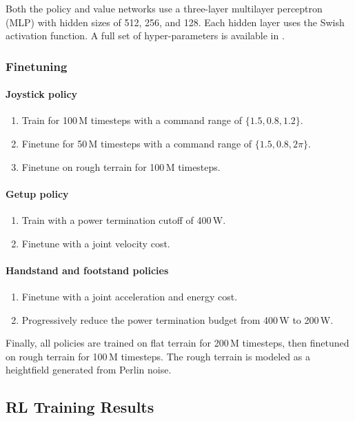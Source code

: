 Both the policy and value networks use a three-layer multilayer perceptron (MLP) with hidden sizes of 512, 256, and 128. Each hidden layer uses the Swish \cite{ramachandran2017searchingactivationfunctions} activation function. A full set of hyper-parameters is available in .

\subsubsection{Finetuning}
\paragraph{Joystick policy}
\begin{enumerate}
    \item Train for 100\,M timesteps with a command range of \(\{1.5, 0.8, 1.2\}\).
    \item Finetune for 50\,M timesteps with a command range of \(\{1.5, 0.8, 2\pi\}\).
    \item Finetune on rough terrain for 100\,M timesteps.
\end{enumerate}

\paragraph{Getup policy}
\begin{enumerate}
    \item Train with a power termination cutoff of 400\,W.
    \item Finetune with a joint velocity cost.
\end{enumerate}

\paragraph{Handstand and footstand policies}
\begin{enumerate}
    \item Finetune with a joint acceleration and energy cost.
    \item Progressively reduce the power termination budget from 400\,W to 200\,W.
\end{enumerate}

Finally, all policies are trained on flat terrain for 200\,M timesteps, then finetuned on rough terrain for 100\,M timesteps. The rough terrain is modeled as a heightfield generated from Perlin noise.


\subsection{RL Training Results}
\label{sec:appendix_locomotion_curves}

